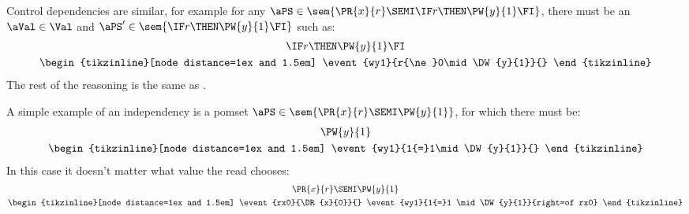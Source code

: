 \begin{example}
  Control dependencies are similar, for example
  for any $\aPS\in\sem{\PR{x}{r}\SEMI \IF r \THEN \PW{y}{1} \FI}$,
  there must be an $\aVal\in\Val$ and $\aPS'\in \sem{\IF r \THEN \PW{y}{1} \FI}$
  such as:
  \begin{gather*}
    \IF r \THEN \PW{y}{1} \FI
    \\
    \nonumber
    \hbox{\begin{tikzinline}[node distance=1ex and 1.5em]
        \event{wy1}{r{\ne}0\mid\DW{y}{1}}{}
      \end{tikzinline}}
  \end{gather*}
  The rest of the reasoning is the same as .
\end{example}

\begin{example}
  A simple example of an independency
  is a pomset $\aPS\in\sem{\PR{x}{r}\SEMI \PW{y}{1}}$,
  for which there must be:
  \begin{gather*}
    \PW{y}{1}
    \\
    \nonumber
    \hbox{\begin{tikzinline}[node distance=1ex and 1.5em]
        \event{wy1}{1{=}1\mid\DW{y}{1}}{}
      \end{tikzinline}}
  \end{gather*}
  In this case it doesn't matter what value the read chooses:
  \begin{gather*}
    \PR{x}{r}\SEMI \PW{y}{1}
    \\
    \nonumber
    \hbox{\begin{tikzinline}[node distance=1ex and 1.5em]
        \event{rx0}{\DR{x}{0}}{}
        \event{wy1}{1{=}1 \mid \DW{y}{1}}{right=of rx0}
      \end{tikzinline}}
  \end{gather*}
\end{example}

